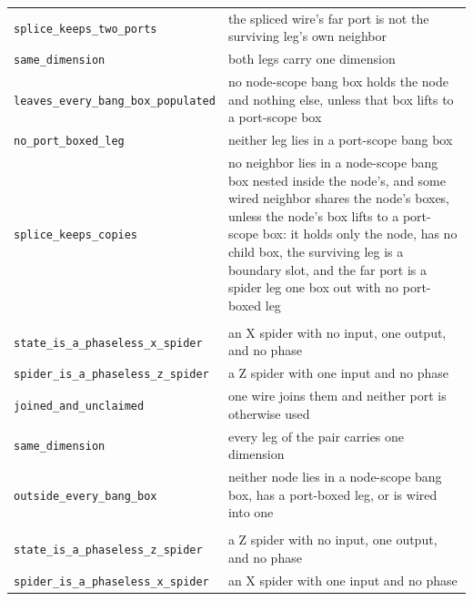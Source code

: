 \begin{xltabular}{\textwidth}{@{}>{\raggedright\arraybackslash}p{0.42\textwidth}>{\raggedright\arraybackslash}X@{}}
\quad\texttt{splice\_\allowbreak{}keeps\_\allowbreak{}two\_\allowbreak{}ports} & the spliced wire's far port is not the surviving leg's own neighbor \\
\quad\texttt{same\_\allowbreak{}dimension} & both legs carry one dimension \\
\quad\texttt{leaves\_\allowbreak{}every\_\allowbreak{}bang\_\allowbreak{}box\_\allowbreak{}populated} & no node-scope bang box holds the node and nothing else, unless that box lifts to a port-scope box \\
\quad\texttt{no\_\allowbreak{}port\_\allowbreak{}boxed\_\allowbreak{}leg} & neither leg lies in a port-scope bang box \\
\quad\texttt{splice\_\allowbreak{}keeps\_\allowbreak{}copies} & no neighbor lies in a node-scope bang box nested inside the node's, and some wired neighbor shares the node's boxes, unless the node's box lifts to a port-scope box: it holds only the node, has no child box, the surviving leg is a boundary slot, and the far port is a spider leg one box out with no port-boxed leg \\
\midrule
{}\\
\quad\texttt{state\_\allowbreak{}is\_\allowbreak{}a\_\allowbreak{}phaseless\_\allowbreak{}x\_\allowbreak{}spider} & an X spider with no input, one output, and no phase \\
\quad\texttt{spider\_\allowbreak{}is\_\allowbreak{}a\_\allowbreak{}phaseless\_\allowbreak{}z\_\allowbreak{}spider} & a Z spider with one input and no phase \\
\quad\texttt{joined\_\allowbreak{}and\_\allowbreak{}unclaimed} & one wire joins them and neither port is otherwise used \\
\quad\texttt{same\_\allowbreak{}dimension} & every leg of the pair carries one dimension \\
\quad\texttt{outside\_\allowbreak{}every\_\allowbreak{}bang\_\allowbreak{}box} & neither node lies in a node-scope bang box, has a port-boxed leg, or is wired into one \\
\midrule
{}\\
\quad\texttt{state\_\allowbreak{}is\_\allowbreak{}a\_\allowbreak{}phaseless\_\allowbreak{}z\_\allowbreak{}spider} & a Z spider with no input, one output, and no phase \\
\quad\texttt{spider\_\allowbreak{}is\_\allowbreak{}a\_\allowbreak{}phaseless\_\allowbreak{}x\_\allowbreak{}spider} & an X spider with one input and no phase \\

\end{xltabular}
